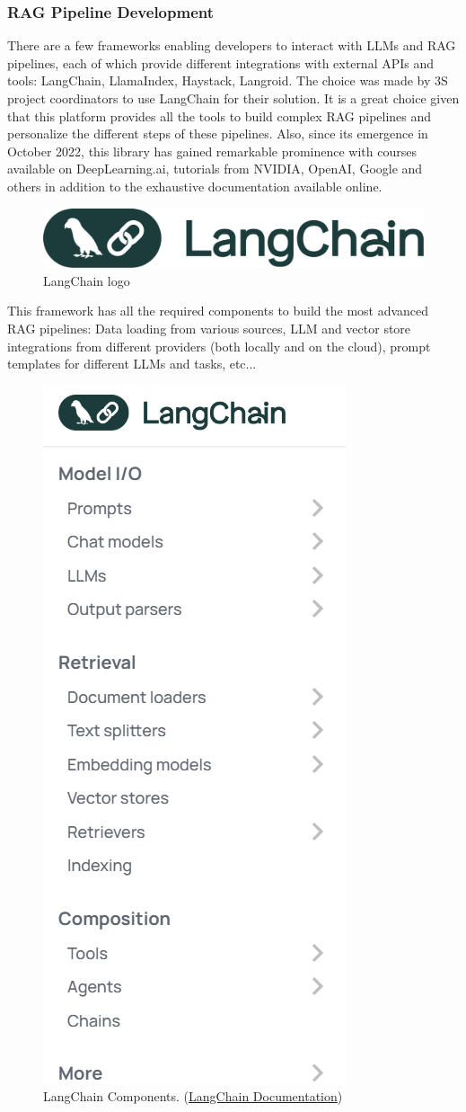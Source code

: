 \subsubsection*{RAG Pipeline Development}
There are a few frameworks enabling developers to interact with LLMs and RAG pipelines, each of which provide different integrations with external APIs and tools: LangChain, LlamaIndex, Haystack, Langroid.\newline
The choice was made by 3S project coordinators to use LangChain for their solution. It is a great choice given that this platform provides all the tools to build complex RAG pipelines and personalize the different steps of these pipelines. Also, since its emergence in October 2022, this library has gained remarkable prominence with courses available on DeepLearning.ai, tutorials from NVIDIA, OpenAI, Google and others in addition to the exhaustive documentation available online.
\begin{figure}[H]
    \centering
    \includegraphics[width=.5\linewidth]{./figures/langchain-logo.png}
    \caption{LangChain logo}
\end{figure}
This framework has all the required components to build the most advanced RAG pipelines: Data loading from various sources, LLM and vector store integrations from different providers (both locally and on the cloud), prompt templates for different LLMs and tasks, etc...
\begin{figure}[H]
    \centering
    \includegraphics[width=.45\linewidth]{./figures/langchain-components.png}
    \caption{LangChain Components. (\href{https://python.langchain.com/v0.1/docs/modules/}{LangChain Documentation})}
\end{figure}
